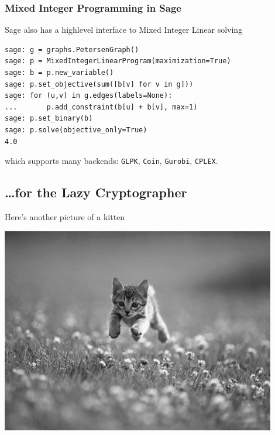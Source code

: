 \documentclass[9pt]{beamer}
\begin{document}
\begin{frame}[fragile]
\frametitle{Mixed Integer Programming in Sage}

Sage also has a highlevel interface to Mixed Integer Linear solving

\begin{lstlisting}
sage: g = graphs.PetersenGraph()
sage: p = MixedIntegerLinearProgram(maximization=True)
sage: b = p.new_variable()
sage: p.set_objective(sum([b[v] for v in g]))
sage: for (u,v) in g.edges(labels=None):
...       p.add_constraint(b[u] + b[v], max=1)
sage: p.set_binary(b)
sage: p.solve(objective_only=True)
4.0
\end{lstlisting}


which supports many backends: {\tt GLPK}, {\tt Coin}, {\tt Gurobi}, {\tt CPLEX}.

\end{frame}


\subsection{\dots for the Lazy Cryptographer}

\begin{frame}{Here's another picture of a kitten}
\begin{center}
 \includegraphics[width=0.9\textwidth]{./kitten-02.jpg}
\end{center} 
\end{frame}
\end{document}
